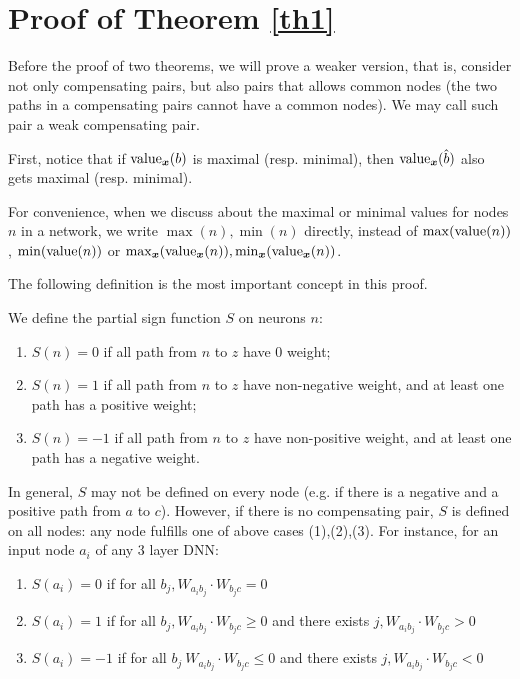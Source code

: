 	\section{Proof of Theorem \ref{th1}}	

Before the proof of two theorems, we will prove a weaker version, that is, consider not only compensating pairs, but also pairs that allows common nodes (the two paths in a compensating pairs cannot have a common nodes). We may call such pair a weak compensating pair.


First, notice that if ${\textrm{value}}_{\boldsymbol{x}}(b)$ is maximal (resp. minimal), 
then ${\textrm{value}}_{\boldsymbol{x}}(\hat{b})$ also gets maximal (resp. minimal). 

For convenience, when we discuss about the maximal or minimal values for nodes $n$ in a network, we write $\max(n),\min(n)$ directly, instead of $\max({\textrm{value}}(n))$, $\min({\textrm{value}}(n))$ or $\max_{\boldsymbol{x}}({\textrm{value}}_{\boldsymbol{x}}(n)),\min_{\boldsymbol{x}}({\textrm{value}}_{\boldsymbol{x}}(n))$.


The following definition is the most important concept in this proof.

\begin{definition}\label{sign_of_nodes}
	We define the partial sign function $S$ on neurons $n$: 	
	\begin{enumerate}
		\item $S(n)=0$ if all path from $n$ to $z$ have 0 weight; 
		\item $S(n)=1$ if all path from $n$ to $z$ have non-negative weight, and at least one path has a positive weight; 
		\item $S(n)=-1$ if all path from $n$ to $z$ have non-positive weight, and at least one path has a negative weight. 
	\end{enumerate}
\end{definition}

In general, $S$ may not be defined on every node (e.g. if there is a negative and a positive path from $a$ to $c$). However, if there is no compensating pair, $S$ is defined on all nodes: any node fulfills one of above cases (1),(2),(3).
For instance, for an input node $a_i$ of any 3 layer DNN:
\begin{enumerate}
	\item  $S(a_i)=0$ if 
	for all $b_j, W_{a_i b_j}\cdot W_{b_j c} = 0$
	
	
	\item  $S(a_i)=1$ if for all $b_j, W_{a_i b_j}\cdot W_{b_j c} \geq 0$ and there exists 
	$j, W_{a_i b_j}\cdot W_{b_j c} > 0$
	
	\item $S(a_i)=-1$ if for all $b_j\ W_{a_i b_j}\cdot W_{b_j c} \leq 0$ and there exists 
	$j, W_{a_i b_j}\cdot W_{b_j c} < 0$ 
\end{enumerate}

